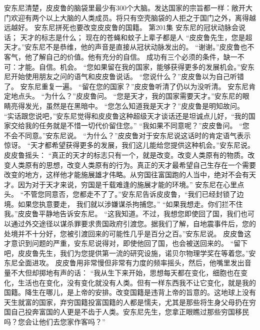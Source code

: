 \documentclass[a4paper,12pt,UTF8,twoside]{ctexbook}
\begin{document}
        安东尼清楚，皮皮鲁的脑袋里最少有300个大脑。发达国家的宗旨都一样：敞开大门欢迎有两个以上大脑的人类成员。将只有空壳脑袋的人拒之于国门之外，离得越远越好。 
        安东尼拼死也要改变皮皮鲁的国籍。   第201集  
        安东尼的冠状动脉会说话；  
        天才的标志是什么；  
        现在的苍蝇和蚊子上辈子都是人      
        “皮皮鲁先生，您是超天才。”安东尼不是恭维，他的声音是直接从冠状动脉发出的。  
        “谢谢。”皮皮鲁也不客气，他了解自己的价值。他有充分的自信。  
        成功有三个必须的条件，缺一不可：才能。自信。机会。  
        “您如果留在我的国家，能够获得更多的发展机会。”安东尼开始使用朋友之问的语气和皮皮鲁说话。  
        “您说什么？”皮皮鲁以为自己听错了。  
        安东尼重复一遍。  
        “留在您的国家？”皮皮鲁听清了仍以为没听清。        
        安东尼肯定地点头。  
        “为什么？”皮皮鲁问。  
        “您是天才，我的国家需要天才。”安东尼的眼睛亮得发光，虽然是在黑暗中。  
        “您怎么知道我是天才？”皮皮鲁是明知故问。  
        “实话跟您说吧，”安东尼觉得和皮皮鲁这种超级天才谈话还是坦诚点儿好，“我的国家交给我的任务就是不惜一切代价留住您。”  
        “我如果不同意呢？”皮皮鲁问。  
        “您不会不同意。”安东尼说。  
        “为什么？”皮皮鲁对于安东尼说这话时的肯定语气表示惊讶。  
        “天才都希望获得更多的发展，我们这儿能给您提供这种机会。”安东尼说。  
        皮皮鲁摇头：  
        “真正的天才的标志只有一个，就是改变。改变人类原有的物质。改变人类原有的思想，改变人类原有的行为。真正的天才最希望自己生存在一个需要改变的地方，这样他才能施展雄才伟略。从穷国往富国跑的人当中，绝对不会有天才。因为对于天才来说，穷国是千载难逢的施展才能的环境。”  
        安东尼在心里点头。  
        “不管您同意否，您都走不了了。”安东尼告诉皮皮鲁，“我们已经封锁了边境。如果您执意要走，        我们就以涉嫌谋杀拘捕您。”  
        “如果我想走。你们拦不住我。”皮皮鲁平静地告诉安东尼。  
        “这我知道。不过，我想您即使回了国，我们也可以通过外交途径以谋杀罪要求贵国政府引渡您。据我们了解，自地震事件后，您的处境并不十分好，您被引渡回来的可能性几乎是百分之百。”安东尼说。  
        皮皮鲁这才意识到问题的严重，安东尼说得对，即使他回了国，也会被送回来的。  
        “留下吧，皮皮鲁先生，我们为您提供第一流的研究设施，诺贝尔物理学奖在等着您。”安东尼全面进攻。  
        皮皮鲁用非常慢但非常有力度的频率摇头，然后，他嘴里发出音量不大但却掷地有声的话：  
        “我从生下来开始，思想每天都在变化，细胞也在变化，生活也在变化，没有变化就没有人类。但有一样东西我不让它变化，就是我的国籍。降生在哪儿，是上帝的安排。改变国籍是违背上帝的旨意的。这地球上没有天生就富的国家，弃穷国籍投富国籍的人都是懦夫，尤其是那些将生身父母扔在穷国自己投奔富国的人更是不齿于人类。安东尼先生，您拿正眼瞧过那些穷国移民吗？您会让他们去您家作客吗？”        
\end{document}
